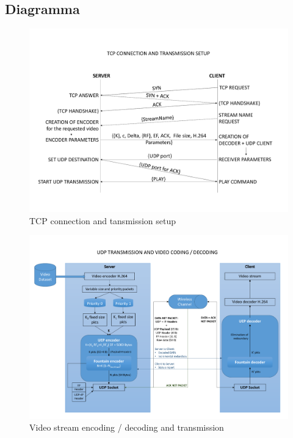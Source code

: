 \documentclass[italian, a4paper, 12pt]{article}
\begin{document}
\subsection{Diagramma}
%
\begin{figure}[H]
    \centering
        \includegraphics[clip, trim=0cm 1cm 0cm 1cm, width=1.00\textwidth]{TCP.pdf}
    \caption{TCP connection and tansmission setup}
    \label{fig:TCP}
\end{figure}
\begin{figure}[H]
    \centering
        \includegraphics[clip, trim=0cm 1cm 0cm 1cm, width=1.00\textwidth]{UDP.pdf}
    \caption{Video stream encoding / decoding and transmission}
    \label{fig:UDP}
\end{figure}
%
\newpage
\end{document}
